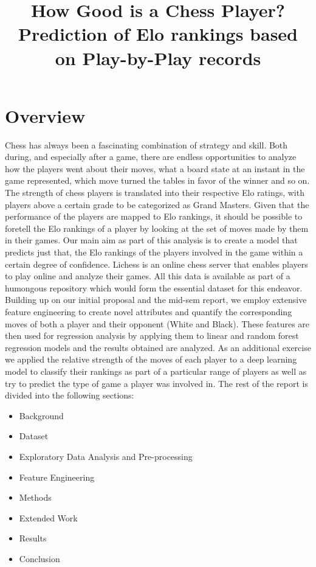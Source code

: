 \documentclass[11pt,a4paper]{article}
\title{How Good is a Chess Player?\\
    Prediction of Elo rankings based on Play-by-Play records}
\begin{document}
\maketitle
\section{Overview}
Chess has always been a fascinating combination of strategy and skill. Both during, and especially after a game, there are endless opportunities to analyze how the players went about their moves, what a board state at an instant in the game represented, which move turned the tables in favor of the winner and so on. The strength of chess players is translated into their respective Elo ratings, with players above a certain grade to be categorized as Grand Masters. Given that the performance of the players are mapped to Elo rankings, it should be possible to foretell the Elo rankings of a player by looking at the set of moves made by them in their games. Our main aim as part of this analysis is to create a model that predicts just that, the Elo rankings of the players involved in the game within a certain degree of confidence. Lichess is an online chess server that enables players to play online and analyze their games. All this data is available as part of a humongous repository which would form the essential dataset for this endeavor. 
Building up on our initial proposal and the mid-sem report, we employ extensive feature engineering to create novel attributes and quantify the corresponding moves of both a player and their opponent (White and Black). These features are then used for regression analysis by applying them to linear and random forest regression models and the results obtained are analyzed. As an additional exercise we applied the relative strength of the moves of each player to a deep learning model to classify their rankings as part of a particular range of players as well as try to predict the type of game a player was involved in.
The rest of the report is divided into the following sections:
\begin{itemize}
    \item Background
    \item Dataset
    \item Exploratory Data Analysis and Pre-processing
    \item Feature Engineering
    \item Methods
    \item Extended Work
    \item Results
    \item Conclusion
\end{itemize}
\end{document}
